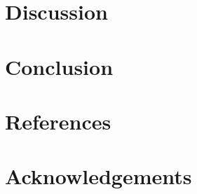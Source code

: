 \documentclass{article}
\begin{document}
	\section{Discussion}
	
	
	\section{Conclusion}
	
	
	\section{References}
	
	
	\section{Acknowledgements}
\end{document}

